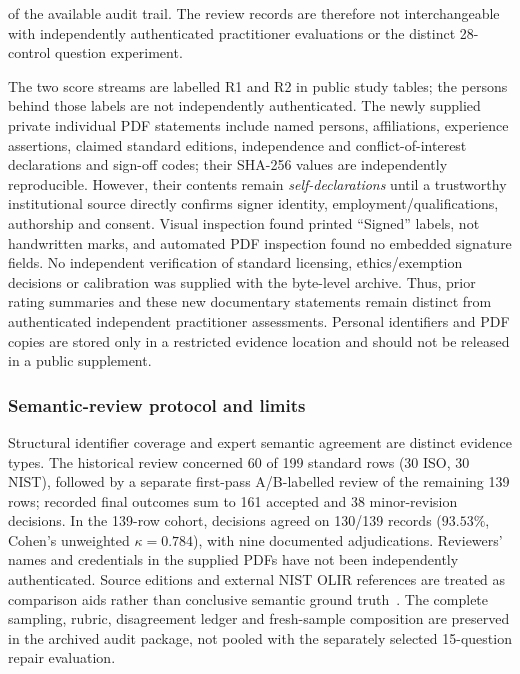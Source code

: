 \documentclass[12pt,a4paper]{article}
\begin{document}
of the available audit trail. The review records are therefore not interchangeable with independently authenticated practitioner evaluations or the distinct 28-control question experiment.

The two score streams are labelled R1 and R2 in public study tables; the persons behind those labels are not independently authenticated. The newly supplied private individual PDF statements include named persons, affiliations, experience assertions, claimed standard editions, independence and conflict-of-interest declarations and sign-off codes; their SHA-256 values are independently reproducible. However, their contents remain \emph{self-declarations} until a trustworthy institutional source directly confirms signer identity, employment/qualifications, authorship and consent. Visual inspection found printed ``Signed'' labels, not handwritten marks, and automated PDF inspection found no embedded signature fields. No independent verification of standard licensing, ethics/exemption decisions or calibration was supplied with the byte-level archive. Thus, prior rating summaries and these new documentary statements remain distinct from authenticated independent practitioner assessments. Personal identifiers and PDF copies are stored only in a restricted evidence location and should not be released in a public supplement.

\subsubsection{Semantic-review protocol and limits}
\label{sec:semantic-audit-method}
Structural identifier coverage and expert semantic agreement are distinct evidence types. The historical review concerned 60 of 199 standard rows (30 ISO, 30 NIST), followed by a separate first-pass A/B-labelled review of the remaining 139 rows; recorded final outcomes sum to 161 accepted and 38 minor-revision decisions. In the 139-row cohort, decisions agreed on 130/139 records ($93.53\%$, Cohen's unweighted $\kappa=0.784$), with nine documented adjudications. Reviewers' names and credentials in the supplied PDFs have not been independently authenticated. Source editions and external NIST OLIR references are treated as comparison aids rather than conclusive semantic ground truth~\cite{NIST_OLIR_218,NIST_OLIR_FAQ}. The complete sampling, rubric, disagreement ledger and fresh-sample composition are preserved in the archived audit package, not pooled with the separately selected 15-question repair evaluation.
\end{document}
